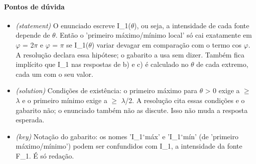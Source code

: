 \documentclass{article}%
\begin{document}
\paragraph{Pontos de dúvida}%
\begin{itemize}%
\item%
\textit{(statement)} O enunciado escreve I\_1($\theta$), ou seja, a intensidade de cada fonte depende de $\theta$. Então o 'primeiro máximo/mínimo local' só cai exatamente em $\varphi$ = 2$\pi$ e $\varphi$ = $\pi$ se I\_1($\theta$) variar devagar em comparação com o termo cos $\varphi$. A resolução declara essa hipótese; o gabarito a usa sem dizer. Também fica implícito que I\_1 nas respostas de b) e c) é calculado no $\theta$ de cada extremo, cada um com o seu valor.%
\item%
\textit{(solution)} Condições de existência: o primeiro máximo para $\theta$ > 0 exige a $\geq$ $\lambda$ e o primeiro mínimo exige a $\geq$ $\lambda$/2. A resolução cita essas condições e o gabarito não; o enunciado também não as discute. Isso não muda a resposta esperada.%
\item%
\textit{(key)} Notação do gabarito: os nomes 'I\_1$^\circ$máx' e 'I\_1$^\circ$mín' (de 'primeiro máximo/mínimo') podem ser confundidos com I\_1, a intensidade da fonte F\_1. É só redação.%
\end{itemize}%
\end{document}

